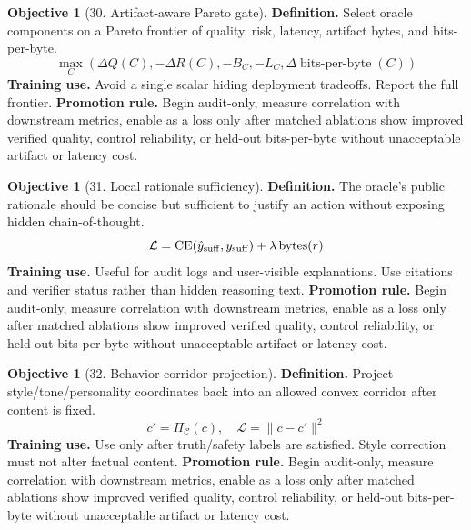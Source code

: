\documentclass[11pt]{article}
\theoremstyle{definition}
\newtheorem{objective}[theorem]{Objective}
\theoremstyle{remark}
\newcommand{\CE}{\operatorname{CE}}
\newcommand{\loss}{\mathcal{L}}
\newcommand{\bits}{\operatorname{bits\mbox{-}per\mbox{-}byte}}
\numberwithin{equation}{section}
\begin{document}
\begin{objective}[30. Artifact-aware Pareto gate]
\textbf{Definition.} Select oracle components on a Pareto frontier of quality, risk, latency, artifact bytes, and bits-per-byte.
\begin{equation}
    \max_C (\Delta Q(C),-\Delta R(C),-B_C,-L_C,\Delta\bits(C))
\end{equation}
\textbf{Training use.} Avoid a single scalar hiding deployment tradeoffs. Report the full frontier.
\textbf{Promotion rule.} Begin audit-only, measure correlation with downstream metrics, enable as a loss only after matched ablations show improved verified quality, control reliability, or held-out bits-per-byte without unacceptable artifact or latency cost.
\end{objective}


\begin{objective}[31. Local rationale sufficiency]
\textbf{Definition.} The oracle's public rationale should be concise but sufficient to justify an action without exposing hidden chain-of-thought.
\begin{equation}
    \loss=\CE(\hat y_{\rm suff},y_{\rm suff})+\lambda\operatorname{bytes}(r)
\end{equation}
\textbf{Training use.} Useful for audit logs and user-visible explanations. Use citations and verifier status rather than hidden reasoning text.
\textbf{Promotion rule.} Begin audit-only, measure correlation with downstream metrics, enable as a loss only after matched ablations show improved verified quality, control reliability, or held-out bits-per-byte without unacceptable artifact or latency cost.
\end{objective}


\begin{objective}[32. Behavior-corridor projection]
\textbf{Definition.} Project style/tone/personality coordinates back into an allowed convex corridor after content is fixed.
\begin{equation}
    c' = \Pi_{\mathcal C}(c),\quad \loss=\|c-c'\|^2
\end{equation}
\textbf{Training use.} Use only after truth/safety labels are satisfied. Style correction must not alter factual content.
\textbf{Promotion rule.} Begin audit-only, measure correlation with downstream metrics, enable as a loss only after matched ablations show improved verified quality, control reliability, or held-out bits-per-byte without unacceptable artifact or latency cost.
\end{objective}
\end{document}
